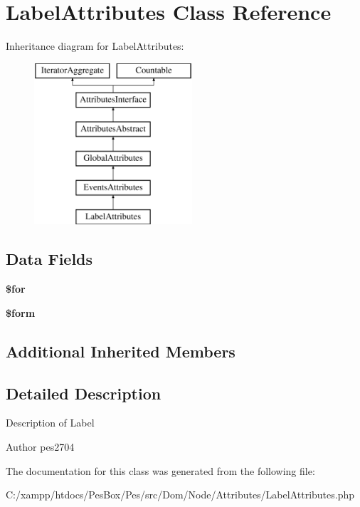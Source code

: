\hypertarget{class_pes_1_1_dom_1_1_node_1_1_attributes_1_1_label_attributes}{}\section{Label\+Attributes Class Reference}
\label{class_pes_1_1_dom_1_1_node_1_1_attributes_1_1_label_attributes}
Inheritance diagram for Label\+Attributes\+:\begin{figure}[H]
\begin{center}
\leavevmode
\includegraphics[height=6.000000cm]{class_pes_1_1_dom_1_1_node_1_1_attributes_1_1_label_attributes}
\end{center}
\end{figure}
\subsection*{Data Fields}
\begin{DoxyCompactItemize}
\item 
\mbox{\label{class_pes_1_1_dom_1_1_node_1_1_attributes_1_1_label_attributes_a11b8710503d84d12fbec1a5fab37946d}} 
{\bfseries \$for}
\item 
\mbox{\label{class_pes_1_1_dom_1_1_node_1_1_attributes_1_1_label_attributes_a1a4fda4c28a9ee5f91102c023b9501f4}} 
{\bfseries \$form}
\end{DoxyCompactItemize}
\subsection*{Additional Inherited Members}


\subsection{Detailed Description}
Description of Label

\begin{DoxyAuthor}{Author}
pes2704 
\end{DoxyAuthor}


The documentation for this class was generated from the following file\+:\begin{DoxyCompactItemize}
\item 
C\+:/xampp/htdocs/\+Pes\+Box/\+Pes/src/\+Dom/\+Node/\+Attributes/Label\+Attributes.\+php\end{DoxyCompactItemize}
